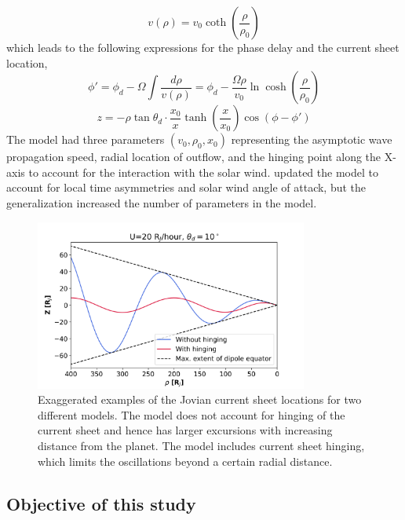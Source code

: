 \begin{equation}
    v(\rho) = v_0 \coth \left(\frac{\rho}{\rho_0} \right)
\end{equation}
which leads to the following expressions for the phase delay and the current sheet location,
\begin{equation}
    \phi' = \phi_d - \Omega \int \frac{d\rho}{v(\rho)} = \phi_d - \frac{\Omega \rho}{v_0} \ln \cosh \left( \frac{\rho}{\rho_0} \right) 
\end{equation}
\begin{equation}
    z = -\rho \tan\theta_d \cdot \frac{x_0}{x} \tanh\left(\frac{x}{x_0} \right) \cos\left( \phi - \phi'\right) 
    \label{eqn:khurana1992}
\end{equation}
The  model had three parameters $(v_0, \rho_0, x_0)$ representing the asymptotic wave propagation speed, radial location of outflow, and the hinging point along the X-axis to account for the interaction with the solar wind.  updated the model to account for local time asymmetries and solar wind angle of attack, but the generalization increased the number of parameters in the model. 

\begin{figure}
    \centering
    \includegraphics[width=0.8\textwidth]{images5/example-hinging.png}
    \caption{Exaggerated examples of the Jovian current sheet locations for two different models. The \protect{} model does not account for hinging of the current sheet and hence has larger excursions with increasing distance from the planet. The \protect{} model includes current sheet hinging, which limits the oscillations beyond a certain radial distance.}
    \label{fig:example-hinging}
\end{figure}

\subsection{Objective of this study}

